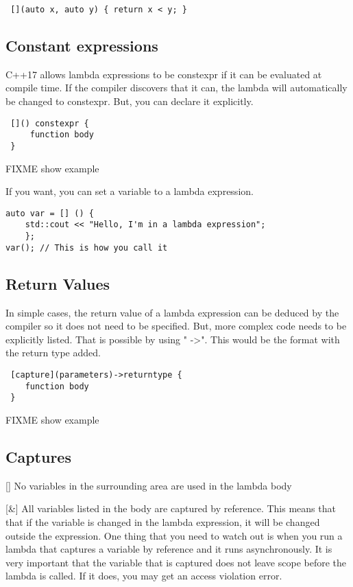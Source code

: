 \begin{lstlisting}
 [](auto x, auto y) { return x < y; }    
\end{lstlisting}

\subsection{Constant expressions}
C++17 allows lambda expressions to be constexpr if it can be evaluated at compile time. If the compiler discovers that it can, the lambda will automatically be changed to constexpr. But, you can declare it explicitly.

\begin{verbatim}
 []() constexpr {
     function body
 }    
\end{verbatim}
FIXME show example

If you want, you can set a variable to a lambda expression. 

\begin{lstlisting}
auto var = [] () { 
    std::cout << "Hello, I'm in a lambda expression"; 
    };
var(); // This is how you call it
\end{lstlisting}

\subsection{Return Values}
In simple cases, the return value of a lambda expression can be deduced by the compiler so it does not need to be specified. But, more complex code needs to be explicitly listed. That is possible by using " -\textgreater ". This would be the format with the return type added.

\begin{verbatim}
 [capture](parameters)->returntype {
    function body
 }    
\end{verbatim}
FIXME show example

\subsection{Captures}
[] No variables in the surrounding area are used in the lambda body

[\&] All variables listed in the body are captured by reference. This means that 
that if the variable is changed in the lambda expression, it will be changed outside the expression.
One thing that you need to watch out is when you run a lambda that captures a variable by reference and it runs asynchronously. It is very important that the variable that is captured does not leave scope before the lambda is called. If it does, you may get an access violation error.

